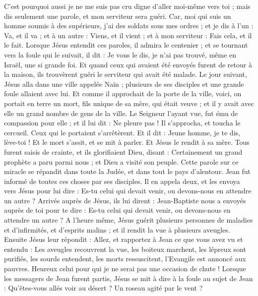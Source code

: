\begin{multicols}{2}
C'est pourquoi aussi je ne me suis pas cru digne d'aller moi-même vers toi ; mais dis seulement une parole, et mon serviteur sera guéri.
Car, moi qui suis un homme soumis à des supérieurs, j'ai des soldats sous mes ordres ; et je dis à l'un : Va, et il va ; et à un autre : Viens, et il vient ; et à mon serviteur : Fais cela, et il le fait.
Lorsque Jésus entendit ces paroles, il admira le centenier ; et se tournant vers la foule qui le suivait, il dit : Je vous le dis, je n'ai pas trouvé, même en Israël, une si grande foi.
Et quand ceux qui avaient été envoyés furent de retour à la maison, ils trouvèrent guéri le serviteur qui avait été malade.
Le jour suivant, Jésus alla dans une ville appelée Naïn ; plusieurs de ses disciples et une grande foule allaient avec lui.
Et comme il approchait de la porte de la ville, voici, on portait en terre un mort, fils unique de sa mère, qui était veuve ; et il y avait avec elle un grand nombre de gens de la ville.
Le Seigneur l’ayant vue, fut ému de compassion pour elle ; et il lui dit : Ne pleure pas !
Il s’approcha, et toucha le cercueil. Ceux qui le portaient s'arrêtèrent. Et il dit : Jeune homme, je te dis, lève-toi !
Et le mort s’assit, et se mit à parler. Et Jésus le rendit à sa mère.
Tous furent saisis de crainte, et ils glorifiaient Dieu, disant : Certainement un grand prophète a paru parmi nous ; et Dieu a visité son peuple.
Cette parole sur ce miracle se répandit dans toute la Judée, et dans tout le pays d’alentour.
Jean fut informé de toutes ces choses par ses disciples.
Il en appela deux, et les envoya vers Jésus pour lui dire : Es-tu celui qui devait venir, ou devons-nous en attendre un autre ?
Arrivés auprès de Jésus, ils lui dirent : Jean-Baptiste nous a envoyés auprès de toi pour te dire : Es-tu celui qui devait venir, ou devons-nous en attendre un autre ?
A l’heure même, Jésus guérit plusieurs personnes de maladies et d’infirmités, et d’esprits malins ; et il rendit la vue à plusieurs aveugles.
Ensuite Jésus leur répondit : Allez, et rapportez à Jean ce que vous avez vu et entendu : Les aveugles recouvrent la vue, les boiteux marchent, les lépreux sont purifiés, les sourds entendent, les morts ressuscitent, l'Evangile est annoncé aux pauvres.
Heureux celui pour qui je ne serai pas une occasion de chute !
Lorsque les messagers de Jean furent partis, Jésus se mit à dire à la foule au sujet de Jean : Qu'êtes-vous allés voir au désert ? Un roseau agité par le vent ?

\end{multicols}
